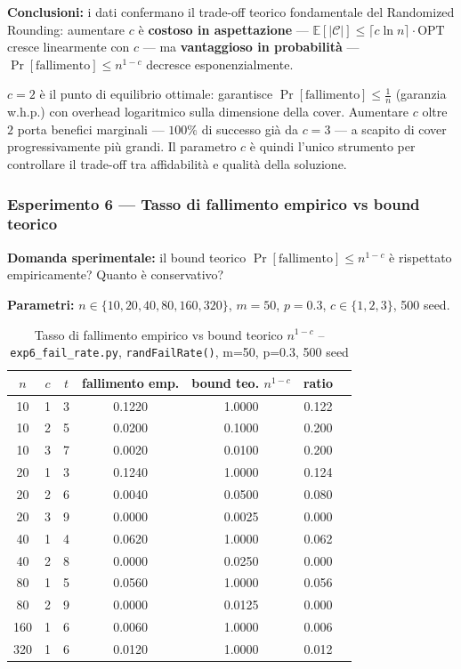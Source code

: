 \documentclass[12pt, a4paper]{article}
\begin{document}
\textbf{Conclusioni:} i dati confermano il trade-off teorico 
fondamentale del Randomized Rounding: aumentare $c$ \`e 
\textbf{costoso in aspettazione} — 
$\mathbb{E}[|\mathcal{C}|] \leq \lceil c \ln n \rceil \cdot \mathrm{OPT}$ 
cresce linearmente con $c$ — ma \textbf{vantaggioso in probabilit\`a} — 
$\Pr[\text{fallimento}] \leq n^{1-c}$ decresce esponenzialmente.

$c=2$ \`e il punto di equilibrio ottimale: garantisce 
$\Pr[\text{fallimento}] \leq \frac{1}{n}$ (garanzia w.h.p.) 
con overhead logaritmico sulla dimensione della cover. 
Aumentare $c$ oltre $2$ porta benefici marginali — 
$100\%$ di successo gi\`a da $c=3$ — a scapito di cover 
progressivamente pi\`u grandi. Il parametro $c$ \`e quindi 
l'unico strumento per controllare il trade-off tra 
affidabilit\`a e qualit\`a della soluzione.

\subsubsection{Esperimento 6 — Tasso di fallimento empirico vs bound teorico}

\textbf{Domanda sperimentale:} il bound teorico $\Pr[\text{fallimento}] \leq n^{1-c}$ 
\`e rispettato empiricamente? Quanto \`e conservativo?

\textbf{Parametri:} $n \in \{10, 20, 40, 80, 160, 320\}$, $m=50$, 
$p=0.3$, $c \in \{1, 2, 3\}$, 500 seed.

\begin{table}[H]
\centering
\caption{Tasso di fallimento empirico vs bound teorico $n^{1-c}$ -- 
\texttt{exp6\_fail\_rate.py}, \texttt{randFailRate()}, m=50, p=0.3, 500 seed}
\label{tab:exp6}
\begin{tabular}{ccccccc}
\toprule
$n$ & $c$ & $t$ & fallimento emp. & bound teo. $n^{1-c}$ & ratio \\
\midrule
10  & 1 & 3 & 0.1220 & 1.0000 & 0.122 \\
10  & 2 & 5 & 0.0200 & 0.1000 & 0.200 \\
10  & 3 & 7 & 0.0020 & 0.0100 & 0.200 \\
20  & 1 & 3 & 0.1240 & 1.0000 & 0.124 \\
20  & 2 & 6 & 0.0040 & 0.0500 & 0.080 \\
20  & 3 & 9 & 0.0000 & 0.0025 & 0.000 \\
40  & 1 & 4 & 0.0620 & 1.0000 & 0.062 \\
40  & 2 & 8 & 0.0000 & 0.0250 & 0.000 \\
80  & 1 & 5 & 0.0560 & 1.0000 & 0.056 \\
80  & 2 & 9 & 0.0000 & 0.0125 & 0.000 \\
160 & 1 & 6 & 0.0060 & 1.0000 & 0.006 \\
320 & 1 & 6 & 0.0120 & 1.0000 & 0.012 \\
\bottomrule
\end{tabular}
\end{table}
\end{document}
